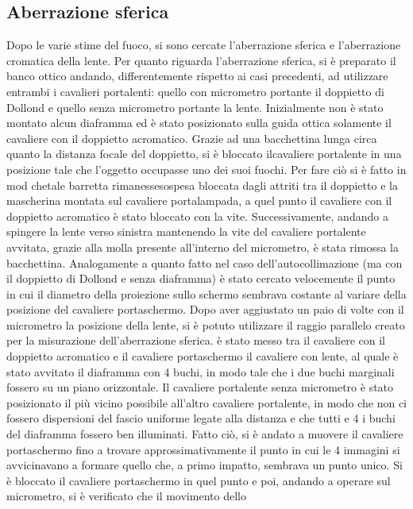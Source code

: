 \subsection{Aberrazione sferica}
Dopo le varie stime del fuoco, si sono cercate l'aberrazione sferica 
e l'aberrazione cromatica della lente. Per quanto riguarda 
l'aberrazione sferica, si è preparato il banco ottico andando, 
differentemente rispetto ai casi precedenti, ad utilizzare entrambi 
i cavalieri portalenti: quello con micrometro portante il doppietto 
di Dollond e quello senza micrometro portante la lente. Inizialmente 
non è stato montato alcun diaframma ed è stato posizionato sulla 
guida ottica solamente il cavaliere con il doppietto acromatico. 
Grazie ad una bacchettina lunga circa quanto la distanza focale del 
doppietto, si è bloccato ilcavaliere portalente in una posizione 
tale che l'oggetto occupasse uno dei suoi fuochi. Per fare ciò si è 
fatto in mod chetale barretta rimanessesospesa bloccata dagli 
attriti tra il doppietto e la mascherina montata sul cavaliere 
portalampada, a quel punto il cavaliere con il doppietto acromatico 
è stato bloccato con la vite. Successivamente, andando a spingere la 
lente verso sinistra mantenendo la vite del cavaliere portalente 
avvitata, grazie alla molla presente all'interno del micrometro, è 
stata rimossa la bacchettina. Analogamente a quanto fatto nel caso 
dell'autocollimazione (ma con il doppietto di Dollond e senza 
diaframma) è stato cercato velocemente il punto in cui il diametro 
della proiezione sullo schermo sembrava costante al variare della 
posizione del cavaliere portaschermo. Dopo aver aggiustato un paio 
di volte con il micrometro la posizione della lente, si è potuto 
utilizzare il raggio parallelo creato per la misurazione 
dell'aberrazione sferica. è stato messo tra il cavaliere con il 
doppietto acromatico e il cavaliere portaschermo il cavaliere con 
lente, al quale è stato avvitato il diaframma con 4 buchi, in modo 
tale che i due buchi marginali fossero su un piano orizzontale. Il 
cavaliere portalente senza micrometro è stato posizionato il più 
vicino possibile all'altro cavaliere portalente, in modo che non ci 
fossero dispersioni del fascio uniforme legate alla distanza e che 
tutti e 4 i buchi del diaframma fossero ben illuminati. Fatto ciò, si 
è andato a muovere il cavaliere portaschermo fino a trovare 
approssimativamente il punto in cui le 4 immagini si avvicinavano a 
formare quello che, a primo impatto, sembrava un punto unico. Si è 
bloccato il cavaliere portaschermo in quel punto e poi, andando a 
operare sul micrometro, si è verificato che il movimento dello 
